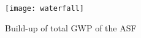 
\begin{figure}[H]
\begin{center}
\texttt{[image: waterfall]}
\caption{Build-up of total GWP of the ASF}
\label{waterfall}
\end{center}
\end{figure}